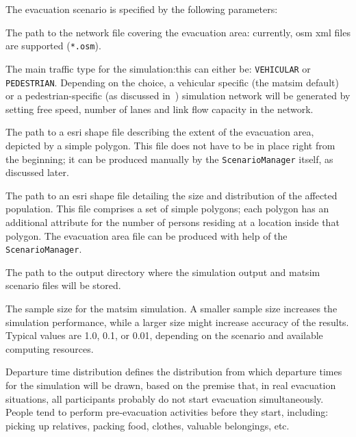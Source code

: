 The evacuation scenario is specified by the following parameters:
\begin{compactitem}
\item The path to the network file covering the evacuation area: currently, \gls{osm} \gls{xml} files are supported (\lstinline|*.osm|).
\item The main traffic type for the simulation:this can either be: \lstinline|VEHICULAR| or \lstinline|PEDESTRIAN|. Depending on the choice, a vehicular specific (the \gls{matsim} default) or a pedestrian-specific (as discussed in~\citet{00LaemmelKluepfelNagel2009EvacPadangAtBookTimmermanns,Laemmel_PhDThesis_2011}) simulation network will be generated by setting free speed, number of lanes and link  flow capacity in the network.
\item The path to a \gls{esri} shape file describing the extent of the evacuation area, depicted by a simple polygon. This file does not have to be in place right from the beginning; it can be produced manually by the \lstinline|ScenarioManager| itself, as discussed later.
\item The path to an \gls{esri} shape file detailing the size and distribution of the affected population. This file comprises a set of simple polygons; each polygon has an additional attribute for the number of persons residing at a location inside that polygon. The evacuation area file can be produced with help of the \lstinline|ScenarioManager|.
\item The path to the output directory where the simulation output and \gls{matsim} scenario files will be stored.
\item The sample size for the \gls{matsim} simulation. A smaller sample size increases the simulation performance, while a larger size might increase accuracy of the results. Typical values are 1.0, 0.1, or 0.01, depending on the scenario and available computing resources.
\item Departure time distribution defines the distribution from which departure times for the simulation will be drawn, based on the premise that, in real evacuation situations, all participants probably do not start evacuation simultaneously. 
People tend to perform pre-evacuation activities before they start, including: picking up relatives, packing food, clothes, valuable belongings, etc. 

\end{compactitem}
